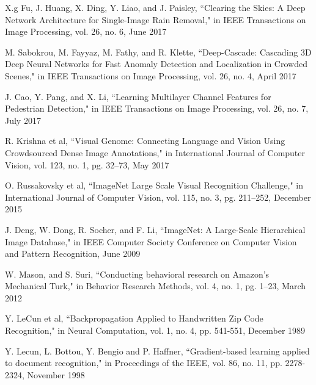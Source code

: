 %
%
%
\begin{thebibliography}{1}

X.g Fu, J. Huang, X. Ding, Y. Liao, and J. Paisley, ``Clearing the Skies: A Deep Network Architecture for Single-Image Rain Removal," in IEEE Transactions on Image Processing, vol. 26, no. 6, June 2017

M. Sabokrou, M. Fayyaz, M. Fathy, and R. Klette, ``Deep-Cascade: Cascading 3D Deep Neural Networks for Fast Anomaly Detection and Localization in Crowded Scenes," in IEEE Transactions on Image Processing, vol. 26, no. 4, April 2017

J. Cao, Y. Pang, and X. Li, ``Learning Multilayer Channel Features for Pedestrian Detection," in IEEE Transactions on Image Processing, vol. 26, no. 7, July 2017



R. Krishna et al, ``Visual Genome: Connecting Language and Vision Using Crowdsourced Dense Image Annotations," in International Journal of Computer Vision, vol. 123, no. 1, pg. 32--73, May 2017


O. Russakovsky et al, ``ImageNet Large Scale Visual Recognition Challenge," in International Journal of Computer Vision, vol. 115, no. 3, pg. 211--252, December 2015

J. Deng, W. Dong, R. Socher, and F. Li, ``ImageNet: A Large-Scale Hierarchical Image Database," in IEEE Computer Society Conference on Computer Vision and Pattern Recognition, June 2009

W. Mason, and S. Suri, ``Conducting behavioral research on Amazon’s Mechanical Turk," in Behavior Research Methods, vol. 4, no. 1, pg. 1--23, March 2012

Y. LeCun et al, ``Backpropagation Applied to Handwritten Zip Code Recognition," in Neural Computation, vol. 1, no. 4, pp. 541-551, December 1989

Y. Lecun, L. Bottou, Y. Bengio and P. Haffner, ``Gradient-based learning applied to document recognition," in Proceedings of the IEEE, vol. 86, no. 11, pp. 2278-2324, November 1998

\end{thebibliography}
